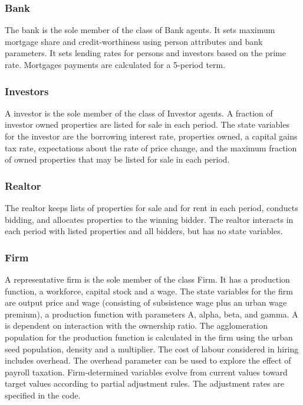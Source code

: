\subsubsection{Bank}
The bank is the sole member of the class of Bank agents. It sets maximum mortgage share and credit-worthiness using person attributes and bank parameters. It sets lending rates for persons and investors based on the prime rate. Mortgages payments are calculated for a 5-period term.
 
\subsubsection{Investors}
A investor is the sole member of the class of Investor agents. A fraction of investor owned properties are listed for sale in each period. The state variables for the investor are the borrowing interest rate, properties owned, a capital gains tax rate, expectations about the rate of price change, and the maximum fraction of owned properties that may be listed for sale in each period.

\subsubsection{Realtor}
The realtor keeps lists of properties for sale and for rent in each period, conducts bidding, and allocates properties to the winning bidder. The realtor interacts in each period with listed properties and  all bidders, but has no state variables.


\subsubsection{Firm}
A representative firm is the sole member of the class Firm. It has a production function, a workforce, capital stock and a wage. 
The state variables for the firm are output price and wage (consisting of subsistence wage plus an urban wage premium), a production function with parameters  A, alpha, beta, and gamma. A is dependent on interaction with the ownership ratio. The agglomeration population for the production function is calculated in the firm using the urban seed population, density and a multiplier. The cost of labour considered in hiring includes overhead. The overhead parameter can be used to explore the effect of payroll taxation. 
Firm-determined variables evolve from current values toward target values according to partial adjustment rules. The adjustment rates are specified in the code.  

